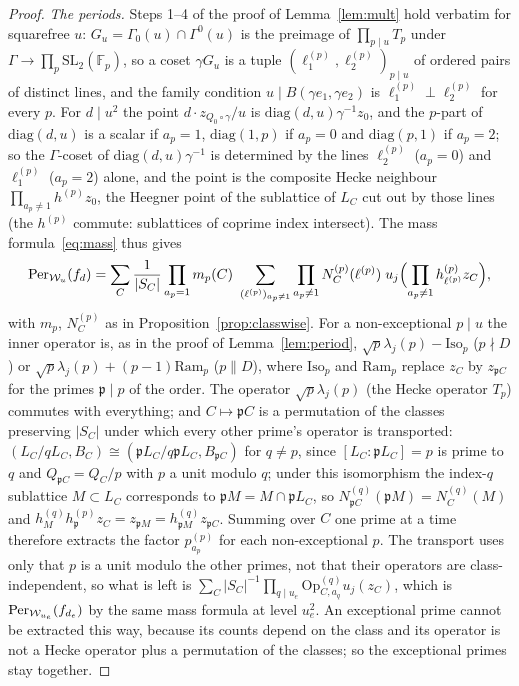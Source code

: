 \documentclass[11pt,a4paper]{article}
\theoremstyle{remark}\newtheorem{remark}[theorem]{Remark}
\begin{document}
\begin{proof}
\emph{The periods.} Steps 1--4 of the proof of Lemma~\ref{lem:mult} hold verbatim for squarefree $u$: $G_u=\Gamma_0(u)\cap\Gamma^0(u)$
is the preimage of $\prod_{p\mid u}T_p$ under $\Gamma\to\prod_p\mathrm{SL}_2(\mathbb F_p)$, so a coset $\gamma G_u$ is a tuple
$(\ell_1^{(p)},\ell_2^{(p)})_{p\mid u}$ of ordered pairs of distinct lines, and the family condition $u\mid B(\gamma e_1,\gamma e_2)$
is $\ell_1^{(p)}\perp\ell_2^{(p)}$ for every $p$. For $d\mid u^2$ the point $d\cdot z_{Q_0\circ\gamma}/u$ is
$\mathrm{diag}(d,u)\gamma^{-1}z_0$, and the $p$-part of $\mathrm{diag}(d,u)$ is a scalar if $a_p=1$, $\mathrm{diag}(1,p)$ if $a_p=0$
and $\mathrm{diag}(p,1)$ if $a_p=2$; so the $\Gamma$-coset of $\mathrm{diag}(d,u)\gamma^{-1}$ is determined by the lines
$\ell_2^{(p)}$ ($a_p=0$) and $\ell_1^{(p)}$ ($a_p=2$) alone, and the point is the composite Hecke neighbour
$\prod_{a_p\ne1}h^{(p)}z_0$, the Heegner point of the sublattice of $L_C$ cut out by those lines (the $h^{(p)}$ commute:
sublattices of coprime index intersect). The mass formula~\eqref{eq:mass} thus gives
\[
\Per_{\mathcal W_u}(f_d)=\sum_C\frac1{|S_C|}\prod_{a_p=1}m_p(C)\ \sum_{(\ell^{(p)})_{a_p\ne1}}\prod_{a_p\ne1}N^{(p)}_C(\ell^{(p)})\;
u_j\Bigl(\prod_{a_p\ne1}h^{(p)}_{\ell^{(p)}}z_C\Bigr),
\]
with $m_p$, $N^{(p)}_C$ as in Proposition~\ref{prop:classwise}. For a non-exceptional $p\mid u$ the inner operator is, as in the proof of
Lemma~\ref{lem:period}, $\sqrt p\lambda_j(p)-\mathrm{Iso}_p$ ($p\nmid D$) or $\sqrt p\lambda_j(p)+(p-1)\mathrm{Ram}_p$ ($p\parallel D$),
where $\mathrm{Iso}_p$ and $\mathrm{Ram}_p$ replace $z_C$ by $z_{\mathfrak pC}$ for the primes $\mathfrak p\mid p$ of the order.
The operator $\sqrt p\lambda_j(p)$ (the Hecke operator $T_p$) commutes with everything; and $C\mapsto\mathfrak pC$ is a permutation of
the classes preserving $|S_C|$ under which every other prime's operator is transported: $(L_C/qL_C,B_C)\cong(\mathfrak pL_C/q\mathfrak pL_C,B_{\mathfrak pC})$
for $q\ne p$, since $[L_C:\mathfrak pL_C]=p$ is prime to $q$ and $Q_{\mathfrak pC}=Q_C/p$ with $p$ a unit modulo $q$; under this
isomorphism the index-$q$ sublattice $M\subset L_C$ corresponds to $\mathfrak pM=M\cap\mathfrak pL_C$, so
$N^{(q)}_{\mathfrak pC}(\mathfrak pM)=N^{(q)}_C(M)$ and $h^{(q)}_Mh^{(p)}_{\mathfrak p}z_C=z_{\mathfrak pM}=h^{(q)}_{\mathfrak pM}z_{\mathfrak pC}$.
Summing over $C$ one prime at a time therefore extracts the factor $p^{(p)}_{a_p}$ for each non-exceptional $p$. The transport uses only
that $p$ is a unit modulo the other primes, not that their operators are class-independent, so what is left is
$\sum_C|S_C|^{-1}\prod_{q\mid u_e}\mathrm{Op}^{(q)}_{C,a_q}u_j(z_C)$, which is $\mathrm{Per}_{\mathcal W_{u_e}}(f_{d_e})$ by the same mass formula at
level $u_e^2$. An exceptional prime cannot be extracted this way, because its counts depend on the class and its operator is not a
Hecke operator plus a permutation of the classes; so the exceptional primes stay together.


\end{proof}
\end{document}

